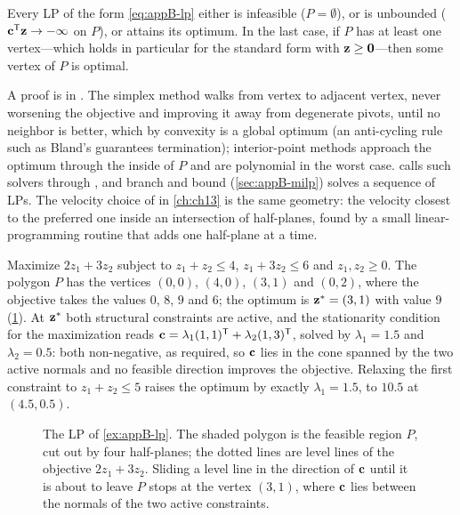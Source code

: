 \begin{theorem}
\label{thm:appB-vertex}
Every LP of the form \cref{eq:appB-lp} either is infeasible ($P = \emptyset$), or is unbounded ($\mathbf{c}^{\mathsf{T}}\mathbf{z} \to -\infty$ on $P$), or attains its optimum. In the last case, if $P$ has at least one vertex---which holds in particular for the standard form with $\mathbf{z} \ge \mathbf{0}$---then some vertex of $P$ is optimal.
\end{theorem}

A proof is in \textcite[Chapter~13]{nocedal2006numerical}. The simplex
method walks from vertex to adjacent vertex, never worsening the objective and
improving it away from degenerate pivots, until no neighbor is better, which
by convexity is a global optimum (an anti-cycling rule such as Bland's
guarantees termination);
interior-point methods approach the optimum through the inside of $P$ and are
polynomial in the worst case.  calls such solvers through
, and branch and bound (\cref{sec:appB-milp}) solves a
sequence of LPs. The velocity choice of \orca in \cref{ch:ch13} is the same
geometry: the velocity closest to the preferred one inside an intersection of
half-planes, found by a small linear-programming routine that adds one
half-plane at a time.

\begin{example}
\label{ex:appB-lp}
Maximize $2z_1 + 3z_2$ subject to $z_1 + z_2 \le 4$, $z_1 + 3z_2 \le 6$ and $z_1, z_2 \ge 0$. The polygon $P$ has the vertices $(0,0)$, $(4,0)$, $(3,1)$ and $(0,2)$, where the objective takes the values $0$, $8$, $9$ and $6$; the optimum is $\mathbf{z}^* = (3, 1)$ with value $9$ (\cref{fig:appB-lp}). At $\mathbf{z}^*$ both structural constraints are active, and the stationarity condition for the maximization reads $\mathbf{c} = \lambda_1(1, 1)^{\mathsf{T}} + \lambda_2(1, 3)^{\mathsf{T}}$, solved by $\lambda_1 = 1.5$ and $\lambda_2 = 0.5$: both non-negative, as required, so $\mathbf{c}$ lies in the cone spanned by the two active normals and no feasible direction improves the objective. Relaxing the first constraint to $z_1 + z_2 \le 5$ raises the optimum by exactly $\lambda_1 = 1.5$, to $10.5$ at $(4.5, 0.5)$.
\end{example}

\begin{figure}[tb]
  \centering
  \caption{The LP of \cref{ex:appB-lp}. The shaded polygon is the feasible region $P$, cut out by four half-planes; the dotted lines are level lines of the objective $2z_1 + 3z_2$. Sliding a level line in the direction of $\mathbf{c}$ until it is about to leave $P$ stops at the vertex $(3, 1)$, where $\mathbf{c}$ lies between the normals of the two active constraints.}
  \label{fig:appB-lp}
\end{figure}

